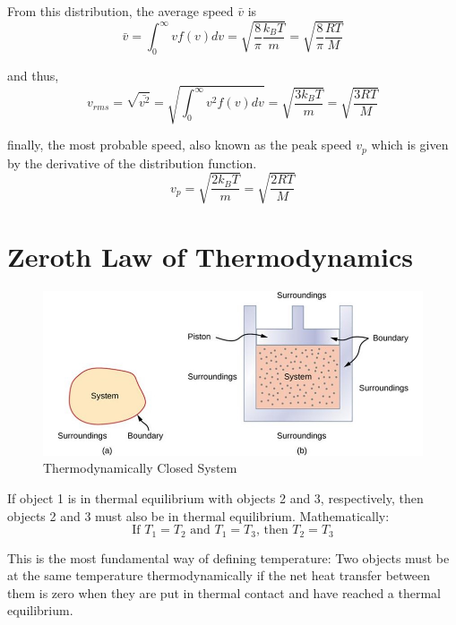 \documentclass[14pt]{memoir}
\begin{document}
From this distribution, the average speed $\bar{v}$ is
\begin{equation}
\bar{v} = \int_0^\infty v f(v) dv = \sqrt{\frac{8}{\pi} \frac{k_B T}{m}} =  \sqrt{\frac{8}{\pi} \frac{R T}{M}}
\end{equation}

and thus, 
\begin{equation}
v_{rms} = \sqrt{\bar{v^2}} = \sqrt{\int_0^\infty v^2 f(v) dv} = \sqrt{\frac{3 k_B T}{m}} = \sqrt{\frac{3RT}{M}}
\end{equation}

finally, the most probable speed, also known as the peak speed $v_p$ which is given by the derivative of the distribution function.
\begin{equation}
v_p = \sqrt{\frac{2 k_B T}{m}} = \sqrt{\frac{2 R T}{M}}
\end{equation}

\section{Zeroth Law of Thermodynamics}

\begin{figure}[H]
\begin{center}
\includegraphics[scale=.6]{fig/fig_03_02.jpg}
\caption{Thermodynamically Closed System}
\label{fig:03_02}
\end{center}
\end{figure} 


If object 1 is in thermal equilibrium with objects 2 and 3, respectively, then objects 2 and 3 must also be in thermal equilibrium. Mathematically:
\begin{equation}
\text{If } T_1 = T_2 \text{ and } T_1 = T_3 \text{, then } T_2 = T_3
\end{equation}

This is the most fundamental way of defining temperature: Two objects must be at the same temperature thermodynamically if the net heat transfer between them is zero when they are put in thermal contact and have reached a thermal equilibrium.
\end{document}
